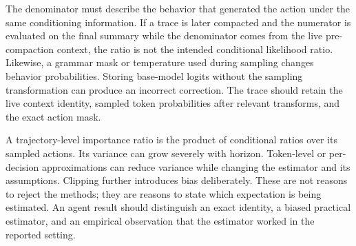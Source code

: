 The denominator must describe the behavior that generated the action under the same conditioning information. If a trace is later compacted and the numerator is evaluated on the final summary while the denominator comes from the live pre-compaction context, the ratio is not the intended conditional likelihood ratio. Likewise, a grammar mask or temperature used during sampling changes behavior probabilities. Storing base-model logits without the sampling transformation can produce an incorrect correction. The trace should retain the live context identity, sampled token probabilities after relevant transforms, and the exact action mask.

A trajectory-level importance ratio is the product of conditional ratios over its sampled actions. Its variance can grow severely with horizon. Token-level or per-decision approximations can reduce variance while changing the estimator and its assumptions. Clipping further introduces bias deliberately. These are not reasons to reject the methods; they are reasons to state which expectation is being estimated. An agent result should distinguish an exact identity, a biased practical estimator, and an empirical observation that the estimator worked in the reported setting.

